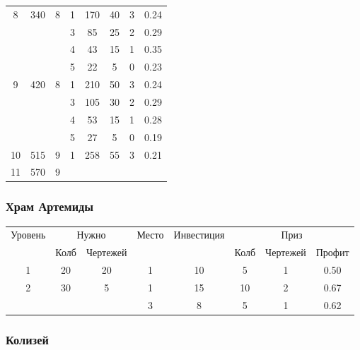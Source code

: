 \begin{longtable}[c]{|c|c|c|c|c|c|c|c|}
    \multirow{4}{*}{8} & \multirow{4}{*}{340} & \multirow{4}{*}{8} & 1 & 170 & 40 & 3 & 0.24 \\\cline{4-8}
    & & & 3 & 85 & 25 & 2 & 0.29 \\\cline{4-8}
    & & & 4 & 43 & 15 & 1 & 0.35 \\\cline{4-8}
    & & & 5 & 22 & 5 & 0 & 0.23 \\\hline
    \multirow{4}{*}{9} & \multirow{4}{*}{420} & \multirow{4}{*}{8} & 1 & 210 & 50 & 3 & 0.24 \\\cline{4-8}
    & & & 3 & 105 & 30 & 2 & 0.29 \\\cline{4-8}
    & & & 4 & 53 & 15 & 1 & 0.28 \\\cline{4-8}
    & & & 5 & 27 & 5 & 0 & 0.19 \\\hline
    \multirow{1}{*}{10} & \multirow{1}{*}{515} & \multirow{1}{*}{9} & 1 & 258 & 55 & 3 & 0.21 \\\hline
    \multirow{1}{*}{11} & \multirow{1}{*}{570} & \multirow{1}{*}{9} & & & & & \\\hline
\end{longtable}


\subsubsection{Храм Артемиды}

\begin{longtable}[c]{|c|c|c|c|c|c|c|c|}
    \hline
    \multirow{ 2}{*}{\small Уровень} &
    \multicolumn{2}{|c|}{\small Нужно} &
    \multirow{ 2}{*}{\small Место} & 
    \multirow{ 2}{*}{\small Инвестиция} & 
    \multicolumn{3}{|c|}{\small Приз} \\\cline{2-3}\cline{6-8}
    &
    {\small Колб} & 
    {\small Чертежей} & 
    & &
    {\small Колб} & 
    {\small Чертежей} & 
    {\small Профит}
    \\\hline\endhead
    \multirow{1}{*}{1} & \multirow{1}{*}{20} & \multirow{1}{*}{20} & 1 & 10 & 5 & 1 & 0.50 \\\hline
    \multirow{2}{*}{2} & \multirow{2}{*}{30} & \multirow{2}{*}{5} & 1 & 15 & 10 & 2 & 0.67 \\\cline{4-8}
    & & & 3 & 8 & 5 & 1 & 0.62 \\\hline
\end{longtable}


\subsubsection{Колизей}

